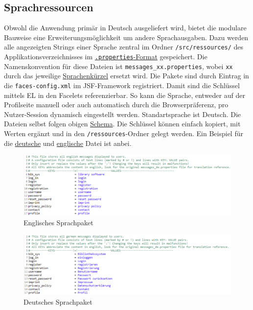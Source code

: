 \documentclass{article}
\begin{document}
\subsection{Sprachressourcen}
\indent Obwohl die Anwendung primär in Deutsch ausgeliefert wird, bietet die modulare Bauweise eine Erweiterungsmöglichkeit um andere Sprachausgaben. Dazu werden alle angezeigten Strings einer Sprache zentral im Ordner \texttt{/src/ressources/} des Applikationsverzeichnisses im \hyperlink{https://de.wikipedia.org/wiki/Java-Properties-Datei}{\texttt{.properties}-Format} gespeichert. Die Namenskonvention für diese Dateien ist \texttt{messages\_xx.properties}, wobei \texttt{xx} durch das jeweilige \hyperlink{https://de.wikipedia.org/wiki/Liste_der_ISO-639-1-Codes}{Sprachenkürzel} ersetzt wird. Die Pakete sind durch Eintrag in die \texttt{faces-config.xml} im JSF-Framework registriert. Damit sind die Schlüssel mittels EL in den Facelets referenzierbar. So kann die Sprache, entweder auf der Profilseite manuell oder auch automatisch durch die Browserpräferenz, pro Nutzer-Session dynamisch eingestellt werden. Standartsprache ist Deutsch. Die Dateien selbst folgen obigen \hyperlink{propSchema}{Schema}. Die Schlüssel können einfach kopiert, mit Werten ergänzt und in den \texttt{/ressources}-Ordner gelegt werden. Ein Beispiel für die \hyperlink{messagesde}{deutsche} und \hyperlink{messagesen}{englische} Datei ist anbei.

\begin{figure}
\hypertarget{messagesen}{}
\centering
\includegraphics[width=60em]{messagesen}
\caption{Englisches Sprachpaket}
\end{figure}

\begin{figure}  
\hypertarget{messagesde}{}
\centering
\includegraphics[width=60em]{messagesde}
\caption{Deutsches Sprachpaket}
\end{figure}
\restoregeometry
\end{document}
